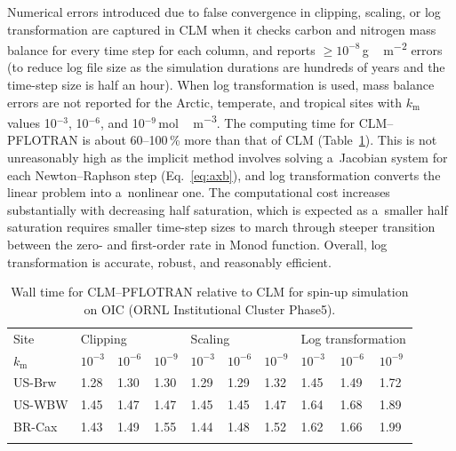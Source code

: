 \documentclass[gmd,noline]{copernicus}
\begin{document}
      Numerical errors introduced due to false convergence in clipping,
      scaling, or log transformation are captured in CLM when it checks
      carbon and nitrogen mass balance for every time step for each column,
      and reports $\geq 10^{-8}$\,\unit{g\,m^{-2}} errors (to reduce log file size as the simulation durations are hundreds of years and the time-step size is half an hour).  When log
      transformation is used, mass balance errors are not reported for the
      Arctic, temperate, and tropical sites with $k_\mathrm{m}$ values
      10$^{-3}$, 10$^{-6}$, and 10$^{-9}$\,\unit{mol\,m^{-3}}. The computing
      time for CLM--PFLOTRAN is about 60--100\,{\%} more than that of
      CLM (Table~\ref{tab:computingtime}). This is not unreasonably high as
      the implicit method involves solving a~Jacobian system for each
      Newton--Raphson step (Eq.~\ref{eq:axb}), and log transformation
      converts the linear problem into a~nonlinear one. The computational
      cost increases substantially with decreasing half saturation, which is
      expected as a~smaller half saturation requires smaller time-step sizes
      to march through steeper transition between the zero- and first-order
      rate in Monod function. Overall, log transformation is accurate,
      robust, and reasonably efficient.


\begin{table}[t]
\caption{Wall time for CLM--PFLOTRAN relative to CLM for spin-up simulation on
OIC (ORNL Institutional Cluster Phase5).} \label{tab:computingtime}
\begin{tabular}{p{20mm}llp{15mm}llp{15mm}lll}
\tophline
Site &\multicolumn{3}{l}{Clipping}  &\multicolumn{3}{l}{Scaling} &\multicolumn{3}{l}{Log transformation} \\
\middlehline
$k_\mathrm{m}$ &$10^{-3}$ &$10^{-6}$ &$10^{-9}$ &$10^{-3}$ &$10^{-6}$ &$10^{-9}$ &$10^{-3}$ &$10^{-6}$ &$10^{-9}$\\
\cline{1-10}
US-Brw &1.28      &1.30 &1.30 &1.29 &1.29 &1.32 &1.45 &1.49 &1.72 \\
US-WBW   &1.45    &1.47 &1.47 &1.45 &1.45 &1.47 &1.64 &1.68 &1.89 \\
BR-Cax &1.43      &1.49 &1.55 &1.44 &1.48 &1.52 &1.62 &1.66 &1.99 \\
\bottomhline
\end{tabular}
\end{table}
\end{document}
